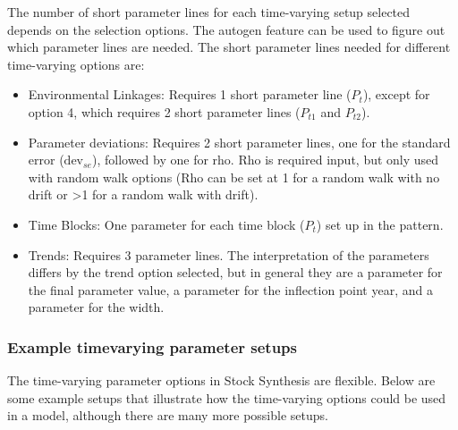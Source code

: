 The number of short parameter lines for each time-varying setup selected depends on the selection options. The autogen feature can be used to figure out which parameter lines are needed. The short parameter lines needed for different time-varying options are:

\begin{itemize}
    \item Environmental Linkages: Requires 1 short parameter line ($P_{t}$), except for option 4, which requires 2 short parameter lines ($P_{t1}$ and $P_{t2}$).
    \item Parameter deviations: Requires 2 short parameter lines, one for the standard error ($\text{dev}_{se}$), followed by one for rho. Rho is required input, but only used with random walk options (Rho can be set at 1 for a random walk with no drift or >1 for a random walk with drift).
    \item Time Blocks: One parameter for each time block ($P_{t}$) set up in the pattern.
    \item Trends: Requires 3 parameter lines. The interpretation of the parameters differs by the trend option selected, but in general they are a parameter for the final parameter value, a parameter for the inflection point year, and a parameter for the width.
\end{itemize}

\subsubsection{Example timevarying parameter setups}

The time-varying parameter options in Stock Synthesis are flexible. Below are some example setups that illustrate how the time-varying options could be used in a model, although there are many more possible setups.

